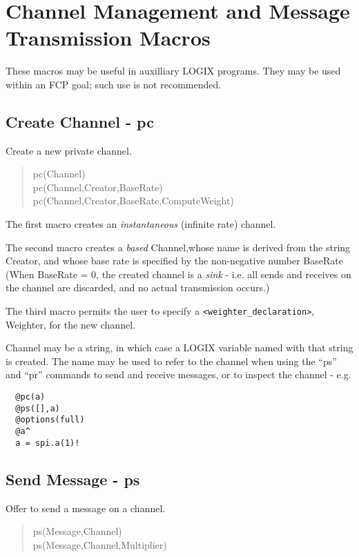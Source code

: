 \section{Channel Management and Message Transmission Macros}

These macros may be useful in auxilliary LOGIX programs.
They may be used within an FCP goal; such use is not recommended.

\subsection{Create Channel - pc}

Create a new private channel.

\begin{verse}
pc(Channel) \\
pc(Channel,Creator,BaseRate) \\
pc(Channel,Creator,BaseRate,ComputeWeight)
\end{verse}

\noindent
The first macro creates an {\em instantaneous}
(infinite rate) channel.

\noindent
The second macro creates a {\em based} Channel,whose
name is derived from the string Creator, and whose base rate is specified by
the non-negative number BaseRate (When BaseRate = 0, the created
channel is a {\em sink} -
i.e. all sends and receives on the channel are discarded, and no actual
transmission occurs.)

\noindent
The third macro permits the user to specify a
\verb+<weighter_declaration>+, Weighter, for the new channel.

\noindent
Channel may be a string, in which case a LOGIX variable named with that
string is created.  The name may be used to refer to the channel
when using the ``ps'' and ``pr'' commands to send and receive messages,
or to inspect the channel - e.g.

\begin{verbatim}
  @pc(a)
  @ps([],a)
  @options(full)
  @a^
  a = spi.a(1)!
\end{verbatim}

\subsection{Send Message - ps}

Offer to send a message on a channel.

\begin{verse}
ps(Message,Channel) \\
ps(Message,Channel,Multiplier)
\end{verse}

